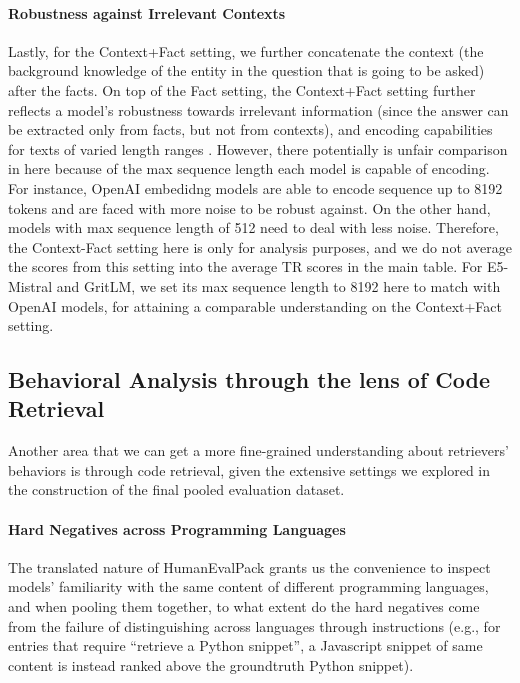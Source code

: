 \documentclass{article} %
\begin{document}
\paragraph{Robustness against Irrelevant Contexts}Lastly, for the Context+Fact setting, we further concatenate the context (the background knowledge of the entity in the question that is going to be asked) after the facts. On top of the Fact setting, the Context+Fact setting further reflects a model's robustness towards irrelevant information (since the answer can be extracted only from facts, but not from contexts), and encoding capabilities for texts of varied length ranges \citep{xiao2023length}. However, there potentially is unfair comparison in here because of the max sequence length each model is capable of encoding. For instance, OpenAI embedidng models are able to encode sequence up to 8192 tokens and are faced with more noise to be robust against. On the other hand, models with max sequence length of 512 need to deal with less noise. Therefore, the Context-Fact setting here is only for analysis purposes, and we do not average the scores from this setting into the average TR scores in the main table. For E5-Mistral and GritLM, we set its max sequence length to 8192 here to match with OpenAI models, for attaining a comparable understanding on the Context+Fact setting.



\subsection{Behavioral Analysis through the lens of Code Retrieval}

Another area that we can get a more fine-grained understanding about retrievers' behaviors is through code retrieval, given the extensive settings we explored in the construction of the final pooled evaluation dataset.

\paragraph{Hard Negatives across Programming Languages}

The translated nature of HumanEvalPack \citep{muennighoff2023octopack} grants us the convenience to inspect models' familiarity with the same content of different programming languages, and when pooling them together, to what extent do the hard negatives come from the failure of distinguishing across languages through instructions (e.g., for entries that require ``retrieve a Python snippet'', a Javascript snippet of same content is instead ranked above the groundtruth Python snippet).
\end{document}

